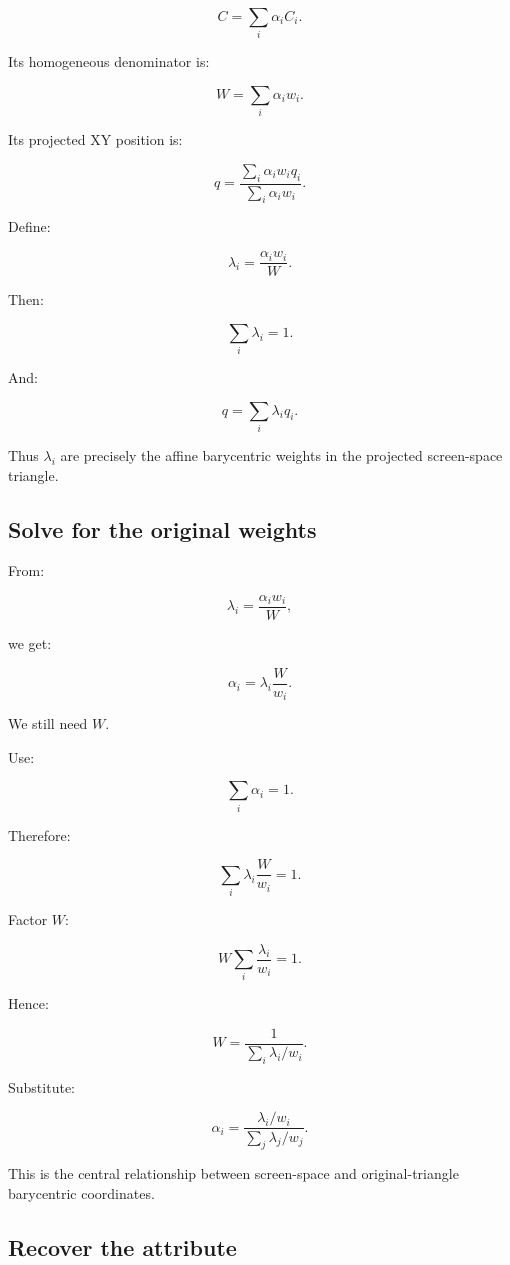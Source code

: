 \[
 \boxed{ C=\sum_i\alpha_iC_i }.
\]

Its homogeneous denominator is:

\[
 \boxed{ W=\sum_i\alpha_iw_i }.
\]

Its projected XY position is:

\[
 q= \frac{ \sum_i\alpha_iw_iq_i }{ \sum_i\alpha_iw_i }.
\]

Define:

\[
 \boxed{ \lambda_i=\frac{\alpha_iw_i}{W} }.
\]

Then:

\[
 \sum_i\lambda_i=1.
\]

And:

\[
 q=\sum_i\lambda_iq_i.
\]

Thus \(\lambda_i\) are precisely the affine barycentric weights in the projected screen-space triangle.

\subsection{Solve for the original weights}\label{02-foundations-ii-ch034-solve-for-the-original-weights}

From:

\[
 \lambda_i=\frac{\alpha_iw_i}{W},
\]

we get:

\[
 \alpha_i=\lambda_i\frac W{w_i}.
\]

We still need \(W\).

Use:

\[
 \sum_i\alpha_i=1.
\]

Therefore:

\[
 \sum_i\lambda_i\frac W{w_i}=1.
\]

Factor \(W\):

\[
 W\sum_i\frac{\lambda_i}{w_i}=1.
\]

Hence:

\[
 \boxed{ W= \frac1{\sum_i\lambda_i/w_i} }.
\]

Substitute:

\[
 \boxed{ \alpha_i= \frac{\lambda_i/w_i} {\sum_j\lambda_j/w_j} }.
\]

This is the central relationship between screen-space and original-triangle barycentric coordinates.

\subsection{Recover the attribute}\label{02-foundations-ii-ch034-recover-the-attribute}

